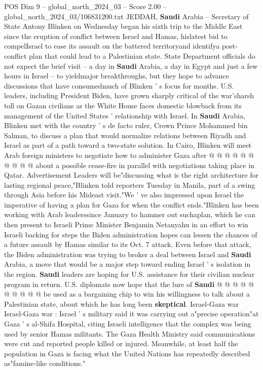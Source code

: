 \begin{textsample}{POS Dim 9 – global\_north\_2024\_03 – Score 2.00 – global\_north\_2024\_03/106831200.txt}  \label{ex:f9_pos_198}
JEDDAH, \textbf{Saudi} Arabia -- Secretary of State Antony Blinken on Wednesday began his sixth trip to the Middle East since the eruption of conflict between Israel and Hamas, hislatest bid to compelIsrael to ease its assault on the battered territoryand identifya post-conflict plan that could lead to a Palestinian state.
State Department officials do not expect the brief visit -- a day in \textbf{Saudi} Arabia, a day in Egypt and just a few hours in Israel -- to yieldmajor breakthroughs, but they hope to advance discussions that have consumedmuch of Blinken ' s focus for months.
U.S. leaders, including President Biden, have grown sharply critical of the war'sharsh toll on Gazan civilians as the White House faces domestic blowback from its management of the United States ' relationship with Israel.
In \textbf{Saudi} Arabia, Blinken met with the country ' s de facto ruler, Crown Prince Mohammed bin Salman, to discuss a plan that would normalize relations between Riyadh and Israel as part of a path toward a two-state solution.
In Cairo, Blinken will meet Arab foreign ministers to negotiate how to administer Gaza after @ @ @ @ @ @ @ @ @ @ about a possible cease-fire in parallel with negotiations taking place in Qatar.
Advertisement Leaders will be"discussing what is the right architecture for lasting regional peace,"Blinken told reporters Tuesday in Manila, part of a swing through Asia before his Mideast visit."We ' ve also impressed upon Israel the imperative of having a plan for Gaza for when the conflict ends."Blinken has been working with Arab leaderssince January to hammer out suchaplan, which he can then present to Israeli Prime Minister Benjamin Netanyahu in an effort to win Israeli backing for steps the Biden administration hopes can lessen the chances of a future assault by Hamas similar to its Oct. 7 attack.
Even before that attack, the Biden administration was trying to broker a deal between Israel and \textbf{Saudi} Arabia, a move that would be a major step toward ending Israel ' s isolation in the region. \textbf{Saudi} leaders are hoping for U.S. assistance for their civilian nuclear program in return.
U.S. diplomats now hope that the lure of \textbf{Saudi} @ @ @ @ @ @ @ @ @ @ be used as a bargaining chip to win his willingness to talk about a Palestinian state, about which he has long been \textbf{skeptical}.
Israel-Gaza war Israel-Gaza war : Israel ' s military said it was carrying out a"precise operation"at Gaza ' s al-Shifa Hospital, citing Israeli intelligence that the complex was being used by senior Hamas militants.
The Gaza Health Ministry said communications were cut and reported people killed or injured.
Meanwhile, at least half the population in Gaza is facing what the United Nations has repeatedly described as"famine-like conditions."

\end{textsample}
